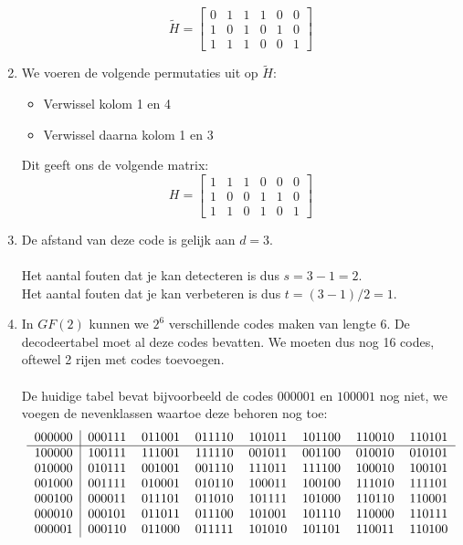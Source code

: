\documentclass[11pt,a4paper,titlepage]{article}
\begin{document}
\begin{enumerate}[label=(\alph*)]
			$$ \tilde{H} = 
 \begin{bmatrix}
 0  & 1 & 1 &1 & 0 & 0 \\
 1 & 0 & 1 &0 & 1 & 0 \\
1 & 1 & 1 &0 & 0 & 1
 \end{bmatrix}$$
	\item We voeren de volgende permutaties uit op $\tilde{H}$:
		\begin{itemize}	
			\item Verwissel kolom 1 en 4
			\item Verwissel daarna kolom 1 en 3
		\end{itemize}
		Dit geeft ons de volgende matrix:
			$$ H = 
 \begin{bmatrix}
 1  & 1 & 1 & 0& 0 & 0 \\
 1 & 0 & 0 &1 & 1 & 0 \\
 1 & 1 & 0 &1 & 0 & 1
 \end{bmatrix}$$
	\item De afstand van deze code is gelijk aan $d = 3$. \\ \\
		Het aantal fouten dat je kan detecteren is dus $s = 3 - 1 = 2$.\\
		Het aantal fouten dat je kan verbeteren is dus $t = (3-1)/2 = 1$.
	\item In $GF(2)$ kunnen we $2^6$ verschillende codes maken van lengte $6$. De decodeertabel moet al deze codes bevatten.
		We moeten dus nog 16 codes, oftewel 2 rijen met codes toevoegen.\\ \\
		De huidige tabel bevat bijvoorbeeld de codes $000001$ en $100001$ nog niet, we voegen de nevenklassen waartoe deze behoren nog toe:
			$$\begin{tabular}{l|lllllll}
000000 & 000111 & 011001 & 011110 & 101011 & 101100 & 110010 & 110101 \\ \hline
100000 & 100111 & 111001 & 111110 & 001011 & 001100 & 010010 & 010101 \\
010000 & 010111 & 001001 & 001110 & 111011 & 111100 & 100010 & 100101 \\
001000 & 001111 & 010001 & 010110 & 100011 & 100100 & 111010 & 111101 \\
000100 & 000011 & 011101 & 011010 & 101111 & 101000 & 110110 & 110001 \\
000010 & 000101 & 011011 & 011100 & 101001 & 101110 & 110000 & 110111 \\
000001 & 000110 & 011000 & 011111 & 101010 & 101101 & 110011 & 110100 \\

\end{tabular}$$
\end{enumerate}
\end{document}
